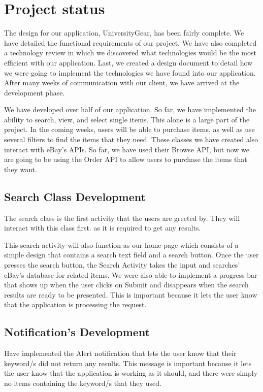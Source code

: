 \documentclass[journal,compsoc, 10pt, draftclsnofoot, onecolumn]{IEEEtran}
\begin{document}
\section{Project status}
The design for our application, UniversityGear, has been fairly complete. We 
have detailed the functional requirements of our project. We have also completed 
a technology review in which we discovered what technologies would be the most 
efficient with our application. Last, we created a design document to detail how 
we were going to implement the technologies we have found into our application.
After many weeks of communication with our client, we have arrived at the 
development phase.\newline

We have developed over half of our application. So far, we have implemented the 
ability to search, view, and select single items. This alone is a large part of 
the project. In the coming weeks, users will be able to purchase items, as well 
as use several filters to find the items that they need. These classes we have 
created also interact with eBay's APIs. So far, we have used their Browse API, 
but now we are going to be using the Order API to allow users to purchase the 
items that they want. 

\subsection{Search Class Development}
The search class is the first activity that the users are greeted by. They will 
interact with this class first. as it is required to get any results. 

This search activity will also function as our home page which consists of a
simple design that contains a search text field and a search button. Once the 
user presses the search button, the Search Activity takes the input and 
searches' eBay's database for related items. We were also able to implement a 
progress bar that shows up when the user clicks on Submit and disappears when 
the search results are ready to be presented. This is important because it lets 
the user know that the application is processing the request. 

\subsection{Notification's Development}
Have implemented the Alert notification that lets the user know that their 
keyword/s did not return any results. This message is important because it 
lets the user know that the application is working as it should, and there 
were simply no items containing the keyword/s that they used.
\end{document}
